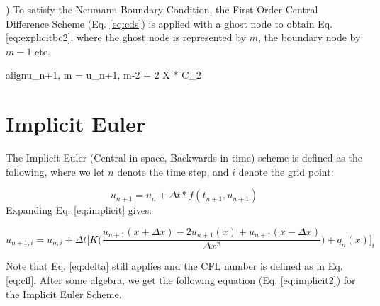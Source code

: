 \documentclass[10pt, letter, showtrims]{extarticle}
\newcommand{\boxedeq}[2]{\begin{empheq}[box={\fboxsep=6pt\fbox}]{align}\label{#1}#2\end{empheq}}
\begin{document}
		) To satisfy the Neumann Boundary Condition, the First-Order Central Difference Scheme (Eq. \ref{eq:cds}) is applied with a ghost node to obtain Eq. \ref{eq:explicitbc2}, where the ghost node is represented by $m$, the boundary node by $m - 1$ etc.
		
		\boxedeq{eq:explicitbc2}{u_{n+1, m} = u_{n+1, m-2} + 2 \Delta X * C_{2}}		
		
		\noindent
		\section{Implicit Euler}
		
		\noindent
		The Implicit Euler (Central in space, Backwards in time) scheme is defined as the following, where we let $n$ denote the time step, and $i$ denote the grid point:
		
		\begin{equation}
		\label{eq:implicit}
			u_{n+1} = u_{n} + \Delta t * f(t_{n+1}, u_{n+1})
		\end{equation}
%		
%		
%		
		\noindent
		Expanding Eq. \ref{eq:implicit} gives:
		
		
		\begin{equation}
			u_{n+1,i} = u_{n,i} + \Delta t \big[ K \big(\frac{u_{n+1}(x + \Delta x) - 2 u_{n+1} (x) + u_{n+1} (x - \Delta x)}{\Delta x^{2}} \big) + q_{n}(x)\big]_{i}
		\end{equation}
	
		\vspace{1em}
		
		\noindent
		Note that Eq. \ref{eq:delta} still applies and the CFL number is defined as in Eq. \ref{eq:cfl}. After some algebra, we get the following equation (Eq. \ref{eq:implicit2}) for the Implicit Euler Scheme.
		
\end{document}
